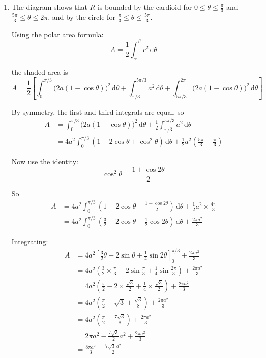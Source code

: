 \documentclass[leqno]{article}
\begin{document}
\begin{enumerate}[
	  label=\textbf{\arabic*.},
	  leftmargin=*,
	  topsep=0pt,
	  partopsep=0pt,
	  parsep=0pt
	]
\begin{djsSolution}
\begin{enumerate}[label=\textbf{(\alph*)}]
	Substituting into either curve gives
	\[
	r=a
	\]

	So the points where $C_1$ meets $C_2$ have polar coordinates
	\[
	\left(a,\frac{\pi}{3}\right) \quad \text{and} \quad \left(a,\frac{5\pi}{3}\right)
	\]
	  \item The diagram shows that $R$ is bounded by the cardioid for $0\le \theta\le \frac{\pi}{3}$ and $\frac{5\pi}{3}\le \theta\le 2\pi$, and by the circle for $\frac{\pi}{3}\le \theta\le \frac{5\pi}{3}$.
	
	Using the polar area formula:
	\[
	A=\frac12\int_{\alpha}^{\beta} r^2\,\mathrm{d}\theta
	\]

	the shaded area is
	\[
	A=\frac12\left[
	\int_0^{\pi/3}\bigl(2a(1-\cos\theta)\bigr)^2\,\mathrm{d}\theta
	+\int_{\pi/3}^{5\pi/3}a^2\,\mathrm{d}\theta
	+\int_{5\pi/3}^{2\pi}\bigl(2a(1-\cos\theta)\bigr)^2\,\mathrm{d}\theta
	\right]
	\]
	
	By symmetry, the first and third integrals are equal, so
	\begin{align*}
	A&=\int_0^{\pi/3}\bigl(2a(1-\cos\theta)\bigr)^2\,\mathrm{d}\theta
	+\frac12\int_{\pi/3}^{5\pi/3}a^2\,\mathrm{d}\theta \\
	&=4a^2\int_0^{\pi/3}(1-2\cos\theta+\cos^2\theta)\,\mathrm{d}\theta
	+\frac12a^2\left(\frac{5\pi}{3}-\frac{\pi}{3}\right)
	\end{align*}
	
	Now use the identity:
	\[
	\cos^2\theta=\frac{1+\cos2\theta}{2}
	\]

	So
	\begin{align*}
	A&=4a^2\int_0^{\pi/3}\left(1-2\cos\theta+\frac{1+\cos2\theta}{2}\right)\,\mathrm{d}\theta
	+\frac12a^2\times\frac{4\pi}{3} \\
	&=4a^2\int_0^{\pi/3}\left(\frac32-2\cos\theta+\frac12\cos2\theta\right)\,\mathrm{d}\theta
	+\frac{2\pi a^2}{3}
	\end{align*}
	
	Integrating:
	\begin{align*}
	A&=4a^2\left[\frac32\theta-2\sin\theta+\frac14\sin2\theta\right]_0^{\pi/3}
	+\frac{2\pi a^2}{3} \\
	&=4a^2\left(\frac32\times\frac{\pi}{3}-2\sin\frac{\pi}{3}+\frac14\sin\frac{2\pi}{3}\right)
	+\frac{2\pi a^2}{3} \\
	&=4a^2\left(\frac{\pi}{2}-2\times\frac{\sqrt3}{2}+\frac14\times\frac{\sqrt3}{2}\right)
	+\frac{2\pi a^2}{3} \\
	&=4a^2\left(\frac{\pi}{2}-\sqrt3+\frac{\sqrt3}{8}\right)
	+\frac{2\pi a^2}{3} \\
	&=4a^2\left(\frac{\pi}{2}-\frac{7\sqrt3}{8}\right)
	+\frac{2\pi a^2}{3} \\
	&=2\pi a^2-\frac{7\sqrt3}{2}a^2+\frac{2\pi a^2}{3} \\
	&=\frac{8\pi a^2}{3}-\frac{7\sqrt3\,a^2}{2}
	\end{align*}
	

\end{enumerate}
\end{djsSolution}
\end{enumerate}
\end{document}

